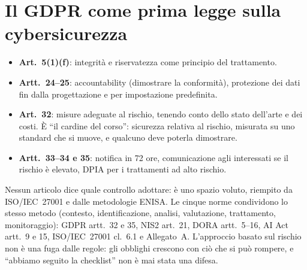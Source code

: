 \section{Il GDPR come prima legge sulla cybersicurezza}
\begin{itemize}
  \item \textbf{Art.~5(1)(f)}: integrità e riservatezza come principio del trattamento.
  \item \textbf{Artt.~24--25}: accountability (dimostrare la conformità), protezione dei dati fin dalla
    progettazione e per impostazione predefinita.
  \item \textbf{Art.~32}: misure adeguate al rischio, tenendo conto dello stato dell'arte e dei costi.
    È ``il cardine del corso'': sicurezza relativa al rischio, misurata su uno standard che si muove,
    e qualcuno deve poterla dimostrare.
  \item \textbf{Artt.~33--34 e 35}: notifica in 72 ore, comunicazione agli interessati se il rischio è
    elevato, DPIA per i trattamenti ad alto rischio.
\end{itemize}
Nessun articolo dice quale controllo adottare: è uno spazio voluto, riempito da ISO/IEC~27001 e dalle
metodologie ENISA. Le cinque norme condividono lo stesso metodo (contesto, identificazione, analisi,
valutazione, trattamento, monitoraggio): GDPR artt.~32 e 35, NIS2 art.~21, DORA artt.~5--16, AI Act
artt.~9 e 15, ISO/IEC~27001 cl.~6.1 e Allegato~A. L'approccio basato sul rischio non è una fuga dalle
regole: gli obblighi crescono con ciò che si può rompere, e ``abbiamo seguito la checklist'' non è mai
stata una difesa.

